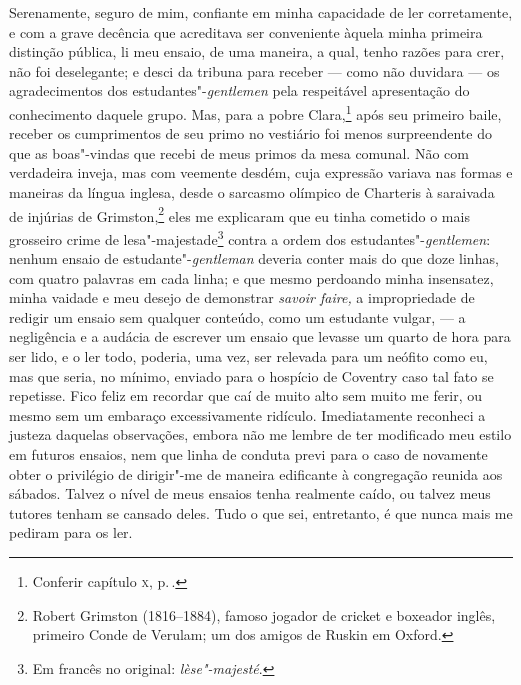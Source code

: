 Serenamente, seguro de mim, confiante em minha capacidade de ler
corretamente, e com a grave decência que acreditava ser conveniente
àquela minha primeira distinção pública, li meu ensaio, de uma maneira,
a qual, tenho razões para crer, não foi deselegante; e desci da tribuna
para receber --- como não duvidara --- os agradecimentos dos
estudantes"-\textit{gentlemen} pela respeitável apresentação do
conhecimento daquele grupo. Mas, para a pobre Clara,\footnote{Conferir
  capítulo \textsc{x}, p.\,\pageref{212}.} após seu primeiro baile, receber os
cumprimentos de seu primo no vestiário foi menos surpreendente do que as
boas"-vindas que recebi de meus primos da mesa comunal. Não com
verdadeira inveja, mas com veemente desdém, cuja expressão variava nas
formas e maneiras da língua inglesa, desde o sarcasmo olímpico de \label{tom}
Charteris à saraivada de injúrias de Grimston,\footnote{Robert Grimston
  (1816--1884), famoso jogador de cricket e boxeador inglês, primeiro Conde de
  Verulam; um dos amigos de Ruskin em Oxford.} eles me
explicaram que eu tinha cometido o mais grosseiro crime de
lesa"-majestade\footnote{Em francês no original: \textit{lèse"-majesté}.} contra a ordem dos estudantes"-\textit{gentlemen}:
nenhum ensaio de estudante"-\textit{gentleman} deveria conter mais do que
doze linhas, com quatro palavras em cada linha; e que mesmo perdoando
minha insensatez, minha vaidade e meu desejo de demonstrar \textit{savoir
faire,} a impropriedade de redigir um ensaio sem qualquer conteúdo, como
um estudante vulgar, --- a negligência e a audácia de escrever um ensaio
que levasse um quarto de hora para ser lido, e o ler todo, poderia, uma
vez, ser relevada para um neófito como eu, mas que seria, no mínimo,
enviado para o hospício de Coventry caso tal fato se repetisse. Fico
feliz em recordar que caí de muito alto sem muito me ferir, ou mesmo sem
um embaraço excessivamente ridículo. Imediatamente reconheci a justeza
daquelas observações, embora não me lembre de ter modificado meu estilo
em futuros ensaios, nem que linha de conduta previ para o caso de
novamente obter o privilégio de dirigir"-me de maneira edificante à
congregação reunida aos sábados. Talvez o nível de meus ensaios tenha
realmente caído, ou talvez meus tutores tenham se cansado deles. Tudo o
que sei, entretanto, é que nunca mais me pediram para os ler.

